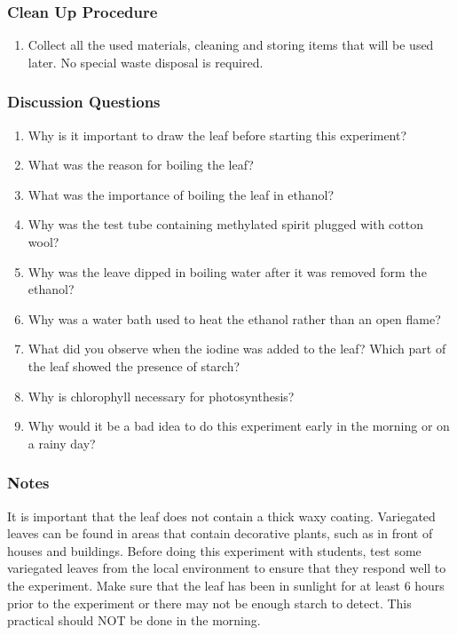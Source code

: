 \subsubsection*{Clean Up Procedure}
\begin{enumerate}
\item{Collect all the used materials, cleaning and storing items that will be used later. No special waste disposal is required.}
\end{enumerate}

\subsubsection*{Discussion Questions}
\begin{enumerate}
\item{Why is it important to draw the leaf before starting this experiment?}
\item{What was the reason for boiling the leaf?}
\item{What was the importance of boiling the leaf in ethanol?}
\item{Why was the test tube containing methylated spirit plugged with cotton wool?}
\item{Why was the leave dipped in boiling water after it was removed form the ethanol?}
\item{Why was a water bath used to heat the ethanol rather than an open flame?}
\item{What did you observe when the iodine was added to the leaf? Which part of the leaf showed the presence of starch?}
\item{Why is chlorophyll necessary for photosynthesis?}
\item{Why would it be a bad idea to do this experiment early in the morning or on a rainy day?}
\end{enumerate}

\subsubsection*{Notes}
It is important that the leaf does not contain a thick waxy coating. Variegated leaves can be found in areas that contain decorative plants, such as in front of houses and buildings. Before doing this experiment with students, test some variegated leaves from the local environment to ensure that they respond well to the experiment. Make sure that the leaf has been in sunlight for at least 6 hours prior to the experiment or there may not be enough starch to detect. This practical should NOT be done in the morning.


